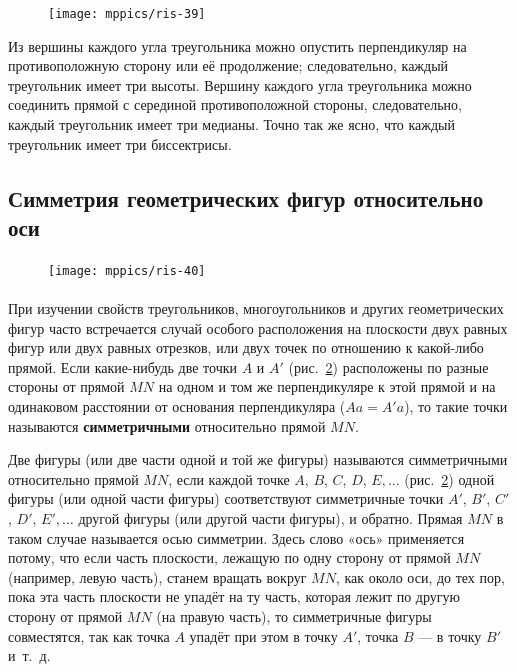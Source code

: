\documentclass[oneside]{book}
\begin{document}
\begin{figure}[h!]
\centering
\texttt{[image: mppics/ris-39]}
\caption{}\label{1938/ris-39}
\end{figure}

Из вершины каждого угла треугольника можно опустить перпендикуляр на противоположную сторону или её продолжение;
следовательно, каждый треугольник имеет три высоты.
Вершину каждого угла треугольника можно соединить прямой с серединой противоположной стороны, следовательно, каждый треугольник имеет три медианы.
Точно так же ясно, что каждый треугольник имеет три биссектрисы.

\subsection*{Симметрия геометрических фигур относительно оси}



\begin{figure}
\centering
\texttt{[image: mppics/ris-40]}
\caption{}\label{1938/ris-40}
\end{figure}

\paragraph{}\label{1938/37}
При изучении свойств треугольников, многоугольников и других геометрических фигур часто встречается случай особого расположения на плоскости двух равных фигур или двух равных отрезков, или двух точек по отношению к какой-либо прямой.
Если какие-нибудь две точки $A$ и $A'$ (рис.~\ref{1938/ris-40}) расположены по разные стороны от прямой $MN$ на одном и том же перпендикуляре к этой прямой и на одинаковом расстоянии от основания перпендикуляра ($Aa=A'a$), то такие точки называются \textbf{симметричными} относительно прямой $MN$.

Две фигуры (или две части одной и той же фигуры) называются симметричными относительно прямой $MN$, если каждой точке $A$, $B$, $C$, $D$, $E,\dots$
(рис.~\ref{1938/ris-40}) одной фигуры (или одной части фигуры) соответствуют симметричные точки $A'$, $B'$, $C'$, $D'$, $E',\dots$ другой фигуры (или другой части фигуры), и обратно.
Прямая $MN$ в таком случае называется осью симметрии. %
Здесь слово «ось» применяется потому, что если часть плоскости, лежащую по одну сторону от прямой $MN$ (например, левую часть), станем вращать вокруг $MN$, как около оси, до тех пор, пока эта часть плоскости не упадёт на ту часть, которая лежит по другую сторону от прямой $MN$ (на правую часть), то симметричные фигуры совместятся, так как точка $A$ упадёт при этом в точку $A'$, точка $B$ — в точку $B'$ и~т.~д.
\end{document}
